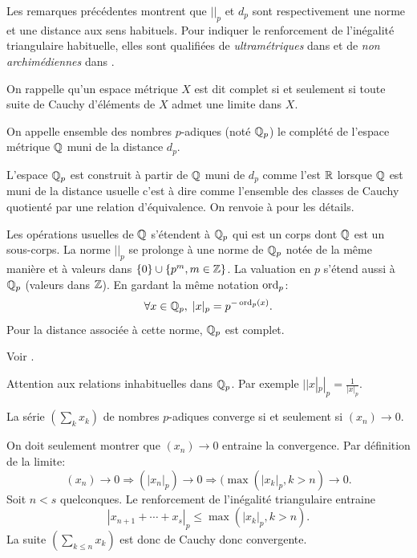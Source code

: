 \noindent
Les remarques précédentes montrent que $||_p$ et $d_p$ sont respectivement une norme et une distance aux sens habituels. Pour indiquer le renforcement de l'inégalité triangulaire habituelle, elles sont qualifiées de \emph{ultramétriques} dans \cite{dieudonne1969elements} et de \emph{non archimédiennes} dans \cite{koblitz2012p}.  

\noindent On rappelle qu'un espace métrique $X$ est dit complet si et seulement si toute suite de Cauchy d'éléments de $X$ admet une limite dans $X$. 
\begin{defi}
 On appelle ensemble des nombres $p$-adiques (noté $\mathbb{Q}_p$) le complété de l'espace métrique $\mathbb{Q}$ muni de la distance $d_p$.
\end{defi}
\begin{demo}
L'espace $\mathbb{Q}_p$ est construit à partir de $\mathbb{Q}$ muni de $d_p$ comme l'est $\mathbb{R}$ lorsque $\mathbb{Q}$ est muni de la distance usuelle c'est à dire comme l'ensemble des classes de Cauchy quotienté par une relation d'équivalence. On renvoie à \cite{koblitz2012p} pour les détails.
\end{demo}
\begin{prop}
 Les opérations usuelles de $\mathbb{Q}$ s'étendent à $\mathbb{Q}_p$ qui est un corps dont $\mathbb{Q}$ est un sous-corps. La norme $| |_p$ se prolonge à une norme de $\mathbb{Q}_p$ notée de la même manière et à valeurs dans $\{0\}\cup\left\lbrace p^m , m\in \mathbb{Z} \right\rbrace$. La valuation en $p$ s'étend aussi à $\mathbb{Q}_p$ (valeurs dans $\mathbb{Z}$). En gardant la même notation $\mathop{\mathrm{ord}}_p$:
 \begin{displaymath}
  \forall x \in \mathbb{Q}_p, \; |x|_p = p^{-\mathop{\mathrm{ord}}_p(x)}.
 \end{displaymath}
Pour la distance associée à cette norme, $\mathbb{Q}_p$ est complet.
\end{prop}
\begin{demo}
 Voir \cite{koblitz2012p}.
\end{demo}
\begin{rem}
 Attention aux relations inhabituelles dans $\mathbb{Q}_p$. Par exemple $||x|_p|_p = \frac{1}{|x|_p}$.
\end{rem}
\begin{prop}
 La série $(\sum_k x_k)$ de nombres $p$-adiques converge si et seulement si $(x_n) \rightarrow 0$.
\end{prop}
\begin{demo}
 On doit seulement montrer que $(x_n)\rightarrow 0$ entraine la convergence. Par définition de la limite:
 \begin{displaymath}
  (x_n)\rightarrow 0 \Rightarrow (|x_n|_p)\rightarrow 0 \Rightarrow (\max(|x_k|_p, k > n) \rightarrow 0 .
 \end{displaymath}
 Soit $n < s$ quelconques. Le renforcement de l'inégalité triangulaire entraine
 \begin{displaymath}
  \left| x_{n+1} + \cdots + x_s\right|_p \leq \max(|x_k|_p, k > n).
 \end{displaymath}
La suite $(\sum_{k\leq n}x_k)$ est donc de Cauchy donc convergente.
\end{demo}

